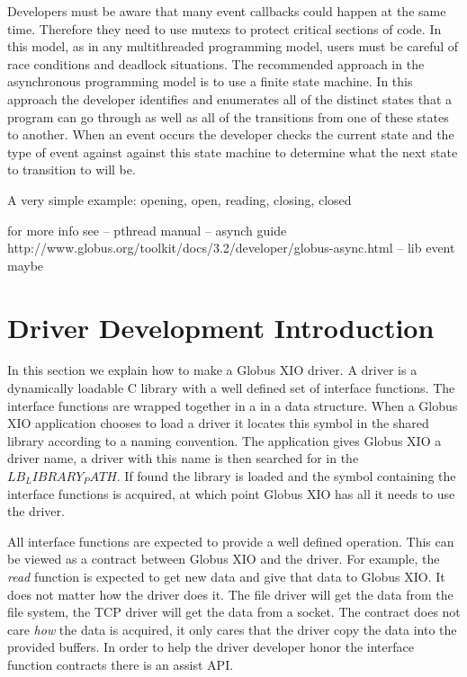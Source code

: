 \documentclass[11pt]{article}
\begin{document}
Developers must be aware that many event callbacks could happen at the same
time.  Therefore they need to use mutexs to protect critical sections
of code.  In this model, as in any multithreaded programming model,
users must be careful of race conditions and deadlock situations.
The recommended approach in the asynchronous programming model is 
to use a finite state machine.  In this approach the developer 
identifies and enumerates all of the distinct states that a program 
can go through as well as all of the transitions from one of these
states to another.  When an event occurs the developer checks the current
state and the type of event against against this state machine to determine
what the next state to transition to will be.

A very simple example:  opening, open, reading, closing, closed

for more info see
-- pthread manual
-- asynch guide
    http://www.globus.org/toolkit/docs/3.2/developer/globus-async.html
-- lib event maybe


\section{Driver Development Introduction}
In this section we explain how to make a Globus XIO driver.  A driver is 
a dynamically loadable C library with a well defined set of interface
functions.  
The interface functions are wrapped together in a in a data structure.
When a Globus XIO application chooses to load a driver it locates this
symbol in the shared library according to a naming convention.
The application gives Globus XIO a driver name, a driver with this name
is then searched for in the $LB_LIBRARY_PATH$.  If found the library is
loaded and the symbol containing the interface functions is acquired,
at which point Globus XIO has all it needs to use the driver.

All interface functions are expected to provide a well defined operation.
This can be viewed as a contract between Globus XIO and the driver.
For example, the \emph{read} function is expected to get new data
and give that data to Globus XIO.  It does not matter how the driver
does it.  The file driver will get the data from the file system, the
TCP driver will get the data from a socket.  The contract does not
care \emph{how} the data is acquired, it only cares that the driver
copy the data into the provided buffers.  In order to help the driver 
developer honor the interface function contracts
there is an assist API.  
\end{document}
